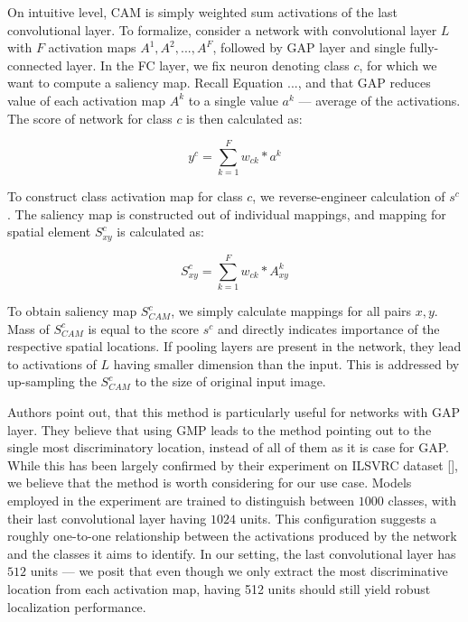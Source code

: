 On intuitive level, CAM is simply weighted sum activations of the last convolutional layer. To formalize, consider a network with convolutional layer $L$ with $F$ activation maps $A^1, A^2, ..., A^F$, followed by GAP layer and single fully-connected layer. In the FC layer, we fix neuron denoting class $c$, for which we want to compute a saliency map. Recall Equation ..., and that GAP reduces value of each activation map $A^k$ to a single value $a^k$ --- average of the activations. The score of network for class $c$ is then calculated as:

\begin{equation}
    y^c = \sum_{k=1}^F w_{ck} * a^k
\end{equation}

To construct class activation map for class $c$, we reverse-engineer calculation of $s^c$. The saliency map is constructed out of individual mappings, and mapping for spatial element $S^c_{xy}$ is calculated as: 

\begin{equation}
    S^c_{xy} = \sum_{k=1}^F w_{ck} * A^k_{xy}
\end{equation}

To obtain saliency map $S^c_{CAM}$, we simply calculate mappings for all pairs $x, y$. Mass of $S^c_{CAM}$ is equal to the score $s^c$ and directly indicates importance of the respective spatial locations. If pooling layers are present in the network, they lead to activations of $L$ having smaller dimension than the input. This is addressed by up-sampling the $S^c_{CAM}$ to the size of original input image.\newline

\noindent
Authors point out, that this method is particularly useful for networks with GAP layer. They believe that using GMP leads to the method pointing out to the single most discriminatory location, instead of all of them as it is case for GAP. While this has been largely confirmed by their experiment on ILSVRC dataset [], we believe that the method is worth considering for our use case. Models employed in the experiment are trained to distinguish between $1000$ classes, with their last convolutional layer having $1024$ units. This configuration suggests a roughly one-to-one relationship between the activations produced by the network and the classes it aims to identify. In our setting, the last convolutional layer has $512$ units --- we posit that even though we only extract the most discriminative location from each activation map, having 512 units should still yield robust localization performance.

